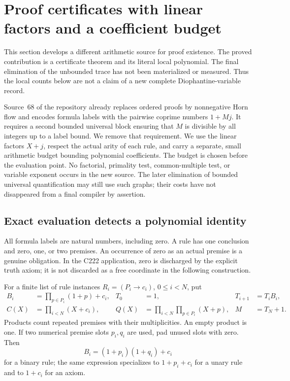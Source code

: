 \section{Proof certificates with linear factors and a coefficient budget}
\label{sec:coefficient-budget}

This section develops a different arithmetic source for proof existence.
The proved contribution is a certificate theorem and its literal local
polynomial.  The final elimination of the unbounded trace has not been
materialized or measured.  Thus the local counts below are not a claim of a
new complete Diophantine-variable record.

Source~68 of the repository\cite{source68} already replaces ordered proofs by nonnegative
Horn flow and encodes formula labels with the pairwise coprime numbers
$1+Mj$.  It requires a second bounded universal block ensuring that $M$ is
divisible by all integers up to a label bound.  We remove that requirement.
We use the linear factors $X+j$, respect the actual arity of each rule, and
carry a separate, small arithmetic budget bounding polynomial coefficients.
The budget is chosen before the evaluation point.  No factorial, primality
test, common-multiple test, or variable exponent occurs in the new source.
The later elimination of bounded universal quantification may still use such
graphs; their costs have not disappeared from a final compiler by assertion.

\newtheorem{budgetlemma}{Lemma}[section]
\newtheorem{budgettheorem}[budgetlemma]{Theorem}
\newtheorem{budgetcorollary}[budgetlemma]{Corollary}

\subsection{Exact evaluation detects a polynomial identity}

All formula labels are natural numbers, including zero.  A rule has one
conclusion and zero, one, or two premises.  An occurrence of zero as an
actual premise is a genuine obligation.  In the C222 application, zero is
discharged by the explicit truth axiom; it is not discarded as a free
coordinate in the following construction.

For a finite list of rule instances
$R_i=(P_i\longrightarrow c_i)$, $0\leq i<N$, put
\begin{align}
 B_i&=\prod_{p\in P_i}(1+p)+c_i,
 &T_0&=1,
 &T_{i+1}&=T_i B_i,                                      \label{eq:budget-update}\\
 C(X)&=\prod_{i<N}(X+c_i),
 &Q(X)&=\prod_{i<N}\prod_{p\in P_i}(X+p),
 &M&=T_N+1.                                               \label{eq:budget-polynomials}
\end{align}
Products count repeated premises with their multiplicities.  An empty
product is one.  If two numerical premise slots $p_i,q_i$ are used, pad
unused slots with zero.  Then
\[
 B_i=(1+p_i)(1+q_i)+c_i
\]
for a binary rule; the same expression specializes to $1+p_i+c_i$ for a
unary rule and to $1+c_i$ for an axiom.


